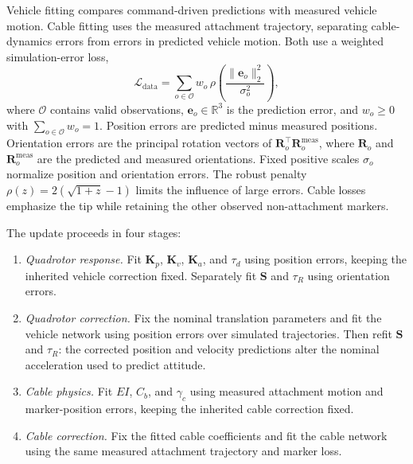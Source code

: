 Vehicle fitting compares command-driven predictions with measured
vehicle motion. Cable fitting uses the measured attachment
trajectory, separating cable-dynamics errors from errors in
predicted vehicle motion. Both use a weighted simulation-error loss,
\begin{equation}
\mathcal L_{\mathrm{data}}
=\sum_{o\in\mathcal O}w_o\,\rho\!\left(\frac{\|\mathbf e_o\|_2^2}{\sigma_o^2}\right),
\label{eq:refinement_data_loss}
\end{equation}
where $\mathcal O$ contains valid observations,
$\mathbf e_o\in\mathbb R^3$ is the prediction error, and
$w_o\geq0$ with $\sum_{o\in\mathcal O}w_o=1$.
Position errors are predicted minus measured positions.
Orientation errors are the principal rotation vectors of
$\mathbf R_o^\top\mathbf R_o^{\mathrm{meas}}$, where
$\mathbf R_o$ and $\mathbf R_o^{\mathrm{meas}}$ are the
predicted and measured orientations.
Fixed positive scales $\sigma_o$ normalize position and
orientation errors. The robust penalty
$\rho(z)=2(\sqrt{1+z}-1)$ limits the influence of large errors.
Cable losses emphasize the tip while retaining the other observed
non-attachment markers.

The update proceeds in four stages:
\begin{enumerate}
    \item \emph{Quadrotor response.}
    Fit $\mathbf K_p$, $\mathbf K_v$, $\mathbf K_a$, and
    $\tau_d$ using position errors, keeping the inherited vehicle
    correction fixed. Separately fit $\mathbf S$ and $\tau_R$
    using orientation errors.

    \item \emph{Quadrotor correction.}
    Fix the nominal translation parameters and fit the vehicle
    network using position errors over simulated trajectories.
    Then refit $\mathbf S$ and $\tau_R$: the corrected position
    and velocity predictions alter the nominal acceleration
    used to predict attitude.

    \item \emph{Cable physics.}
    Fit $EI$, $C_b$, and $\gamma_c$ using measured attachment
    motion and marker-position errors, keeping the inherited
    cable correction fixed.

    \item \emph{Cable correction.}
    Fix the fitted cable coefficients and fit the cable network
    using the same measured attachment trajectory and marker loss.
\end{enumerate}

